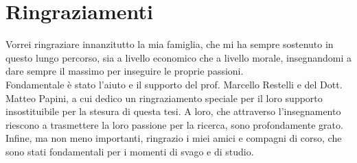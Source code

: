 \chapter*{Ringraziamenti}
\thispagestyle{empty}

Vorrei ringraziare innanzitutto la mia famiglia, che mi ha sempre sostenuto in questo lungo percorso, sia a livello economico che a livello morale, insegnandomi a dare sempre il massimo per inseguire le proprie passioni.\\
Fondamentale è stato l'aiuto e il supporto del prof. Marcello Restelli e del Dott. Matteo Papini, a cui dedico un ringraziamento speciale per il loro supporto insostituibile per la stesura di questa tesi. A loro, che attraverso l'insegnamento riescono a trasmettere la loro passione per la ricerca, sono profondamente grato.\\
Infine, ma non meno importanti, ringrazio i miei amici e compagni di corso, che sono stati fondamentali per i momenti di svago e di studio. 